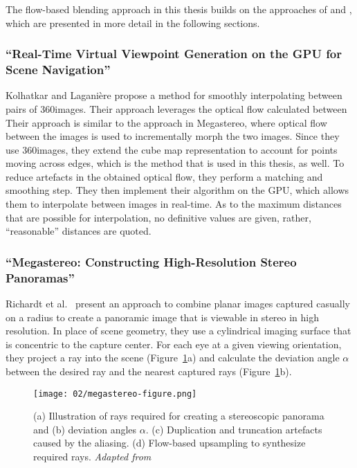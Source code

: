 
The flow-based blending approach in this thesis builds on the approaches of \cite{megastereo} and \cite{360flowblending}, which are presented in more detail in the following sections.

\subsubsection{``Real-Time Virtual Viewpoint Generation on the GPU for Scene Navigation'' \cite{360flowblending}}
Kolhatkar and Lagani\`ere \cite{360flowblending} propose a method for smoothly interpolating between pairs of 360\degree images. Their approach leverages the optical flow calculated between 
Their approach is similar to the approach in Megastereo, where optical flow between the images is used to incrementally morph the two images. Since they use 360\degree images, they extend the cube map representation to account for points moving across edges, which is the method that is used in this thesis, as well. To reduce artefacts in the obtained optical flow, they perform a matching and smoothing step. They then implement their algorithm on the GPU, which allows them to interpolate between images in real-time. As to the maximum distances that are possible for interpolation, no definitive values are given, rather, ``reasonable'' distances are quoted.


\subsubsection{``Megastereo: Constructing High-Resolution Stereo Panoramas'' \cite{megastereo} \label{subsec:megastereo}}
Richardt et al.\ \cite{megastereo} present an approach to combine planar images captured casually on a radius to create a panoramic image that is viewable in stereo in high resolution. In place of scene geometry, they use a cylindrical imaging surface that is concentric to the capture center. For each eye at a given viewing orientation, they project a ray into the scene (Figure~\ref{fig:megastereo}a) and calculate the deviation angle $\alpha$ between the desired ray and the nearest captured rays (Figure~\ref{fig:megastereo}b). 

\begin{figure}[]
\centering
\texttt{[image: 02/megastereo-figure.png]}
\caption[Flow-based blending in Megastereo \cite{megastereo}]{(a) Illustration of rays required for creating a stereoscopic panorama and (b) deviation angles $\alpha$. (c) Duplication and truncation artefacts caused by the aliasing. (d) Flow-based upsampling to synthesize required rays. \emph{Adapted from \cite{megastereo}}}
\label{fig:megastereo}
\end{figure}

